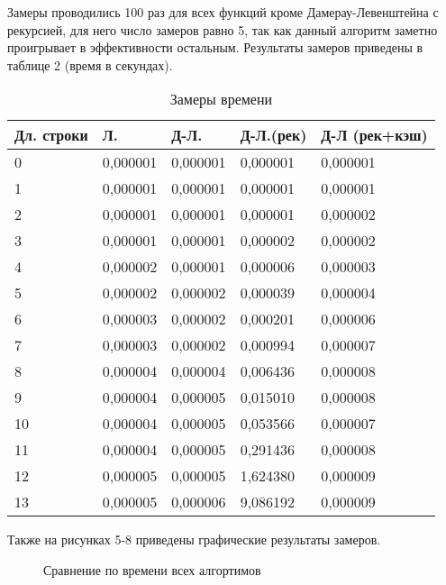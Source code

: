 Замеры проводились 100 раз для всех функций кроме Дамерау-Левенштейна с рекурсией, для него число замеров равно 5, так как данный алгоритм заметно проигрывает в эффективности остальным.
Результаты замеров приведены в таблице 2 (время в секундах).
\pagebreak
\begin{table}[!h]
	\captionsetup{justification=raggedright}
    \caption{Замеры времени}
    \begin{tabular}{|l|l|l|l|l|}
    \hline
        Дл. строки & Л. & Д-Л. & Д-Л.(рек) & Д-Л (рек+кэш) \\ \hline
        0 & 0,000001 & 0,000001 & 0,000001 & 0,000001 \\ \hline
        1 & 0,000001 & 0,000001 & 0,000001 & 0,000001 \\ \hline
        2 & 0,000001 & 0,000001 & 0,000001 & 0,000002 \\ \hline
        3 & 0,000001 & 0,000001 & 0,000002 & 0,000002 \\ \hline
        4 & 0,000002 & 0,000001 & 0,000006 & 0,000003 \\ \hline
        5 & 0,000002 & 0,000002 & 0,000039 & 0,000004 \\ \hline
        6 & 0,000003 & 0,000002 & 0,000201 & 0,000006 \\ \hline
        7 & 0,000003 & 0,000002 & 0,000994 & 0,000007 \\ \hline
        8 & 0,000004 & 0,000004 & 0,006436 & 0,000008 \\ \hline
        9 & 0,000004 & 0,000005 & 0,015010 & 0,000008 \\ \hline
        10 & 0,000004 & 0,000005 & 0,053566 & 0,000007 \\ \hline
        11 & 0,000004 & 0,000005 & 0,291436 & 0,000008 \\ \hline
        12 & 0,000005 & 0,000005 & 1,624380 & 0,000009 \\ \hline
        13 & 0,000005 & 0,000006 & 9,086192 & 0,000009 \\ \hline
    \end{tabular}
\end{table}

Также на рисунках 5-8 приведены графические результаты замеров.

\begin{figure}[!h]
	\centering
	\captionsetup{justification=centering}
    \def\svgscale{0.45}
	
	\caption{Сравнение по времени всех алгортимов}
	\label{fig:r1}
\end{figure}

